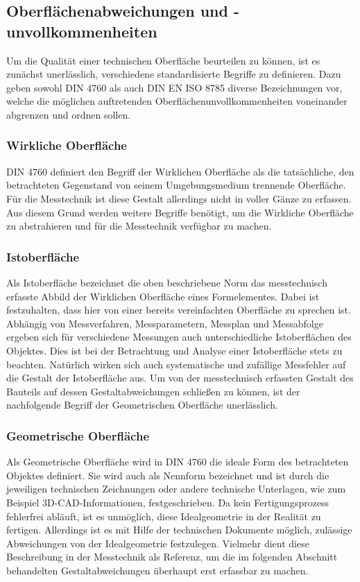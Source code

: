\subsection{Oberflächenabweichungen und -unvollkommenheiten}

Um die Qualität einer technischen Oberfläche beurteilen zu können, ist es zunächst unerlässlich, verschiedene standardisierte Begriffe zu definieren. Dazu geben sowohl DIN 4760 \cite{DIN.4760} als auch DIN EN ISO 8785 \cite{DIN.8785} diverse Bezeichnungen vor, welche die möglichen auftretenden Oberflächenunvollkommenheiten voneinander abgrenzen und ordnen sollen.

\subsubsection{Wirkliche Oberfläche}

DIN 4760 definiert den Begriff der Wirklichen Oberfläche als die tatsächliche, den betrachteten Gegenstand von seinem Umgebungsmedium trennende Oberfläche. Für die Messtechnik ist diese Gestalt allerdings nicht in voller Gänze zu erfassen. Aus diesem Grund werden weitere Begriffe benötigt, um die Wirkliche Oberfläche zu abstrahieren und für die Messtechnik verfügbar zu machen. 

\subsubsection{Istoberfläche}

Als Istoberfläche bezeichnet die oben beschriebene Norm das messtechnisch erfasste Abbild der Wirklichen Oberfläche eines Formelementes. Dabei ist festzuhalten, dass hier von einer bereits vereinfachten Oberfläche zu sprechen ist. Abhängig von Messverfahren, Messparametern, Messplan und Messabfolge ergeben sich für verschiedene Messungen auch unterschiedliche Istoberflächen des Objektes. Dies ist bei der Betrachtung und Analyse einer Istoberfläche stets zu beachten. Natürlich wirken sich auch systematische und zufällige Messfehler auf die Gestalt der Istoberfläche aus. Um von der messtechnisch erfassten Gestalt des Bauteils auf dessen Gestaltabweichungen schließen zu können, ist der nachfolgende Begriff der Geometrischen Oberfläche unerlässlich. 

\subsubsection{Geometrische Oberfläche}

Als Geometrische Oberfläche wird in DIN 4760 die ideale Form des betrachteten Objektes definiert. Sie wird auch als Nennform bezeichnet und ist durch die jeweiligen technischen Zeichnungen oder andere technische Unterlagen, wie zum Beispiel 3D-CAD-Informationen, festgeschrieben. Da kein Fertigungsprozess fehlerfrei abläuft, ist es unmöglich, diese Idealgeometrie in der Realität zu fertigen. Allerdings ist es mit Hilfe der technischen Dokumente möglich, zulässige Abweichungen von der Idealgeometrie festzulegen. Vielmehr dient diese Beschreibung in der Messtechnik als Referenz, um die im folgenden Abschnitt behandelten Gestaltabweichungen überhaupt erst erfassbar zu machen.
     
